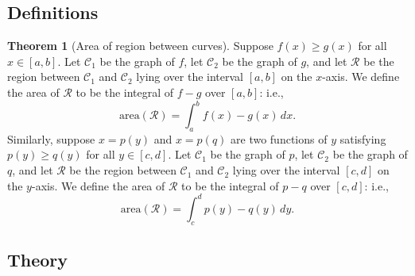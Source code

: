 \documentclass[11pt]{article}
\theoremstyle{definition}
\newtheorem*{comment}{Comment}
\theoremstyle{named}
\newtheorem*{namedtheorem}{Theorem}
\numberwithin{myalgctr}{section}
\begin{document}
\thispagestyle{fancy}
\subsection*{Definitions}
\begin{namedtheorem}[Area of region between curves] Suppose $f(x)\geq g(x)$ for all $x\in [a,b]$. Let $\mathcal{C}_1$ be the graph of $f$, let $\mathcal{C}_2$ be the graph of $g$, and let $\mathcal{R}$ be the region between $\mathcal{C}_1$ and $\mathcal{C}_2$ lying over the interval $[a,b]$ on the $x$-axis. We define the area of $\mathcal{R}$ to be the integral of $f-g$ over $[a,b]$: i.e.,
  \[
  \text{area}(\mathcal{R})=\int_a^b f(x)-g(x)\, dx.
  \]
Similarly, suppose $x=p(y)$ and $x=p(q)$ are two functions of $y$ satisfying $p(y)\geq q(y)$ for all $y\in [c,d]$. Let $\mathcal{C}_1$ be the graph of $p$, let $\mathcal{C}_2$ be the graph of $q$, and let $\mathcal{R}$ be the region between $\mathcal{C}_1$ and $\mathcal{C}_2$ lying over the interval $[c,d]$ on the $y$-axis. We define the area of $\mathcal{R}$ to be the integral of $p-q$ over $[c,d]$: i.e.,
  \[
  \text{area}(\mathcal{R})=\int_c^d p(y)-q(y)\, dy.
  \]
\end{namedtheorem}
\begin{comment}
Observe that the definition only applies when $f(x)\geq g(x)$ for all $x$ in the given interval. This ensures that the area of $\mathcal{R}$, as defined, is at least nonnegative.
\end{comment}
 \subsection*{Theory}
\end{document}
